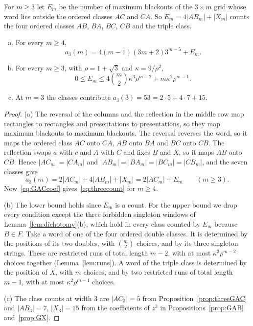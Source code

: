 \begin{theorem}\label{thm:threecount}
For $m\ge3$ let $E_m$ be the number of maximum blackouts of the $3\times m$ grid whose word
lies outside the ordered classes $AC$ and $CA$. So $E_m=4|AB_m|+|X_m|$ counts the four
ordered classes $AB$, $BA$, $BC$, $CB$ and the triple class.
\begin{enumerate}[(a)]
\item For every $m\ge4$,
\begin{equation}\label{eq:threecount}
a_3(m)=4(m-1)(3m+2)3^{m-5}+E_m.
\end{equation}
\item For every $m\ge3$, with $\rho=1+\sqrt3$ and $\kappa=9/\rho^2$,
\begin{equation}\label{eq:Embound}
0\le E_m\le4\binom m2\kappa^3\rho^{m-2}+m\kappa^2\rho^{m-1}.
\end{equation}
\item At $m=3$ the classes contribute $a_3(3)=53=2\cdot5+4\cdot7+15$.
\end{enumerate}
\end{theorem}

\begin{proof}
(a) The reversal of the columns and the reflection in the middle row map rectangles to
rectangles and presentations to presentations, so they map maximum blackouts to maximum
blackouts. The reversal reverses the word, so it maps the ordered class $AC$ onto $CA$, $AB$
onto $BA$ and $BC$ onto $CB$. The reflection swaps $a$ with $c$ and $A$ with $C$ and fixes
$B$ and $X$, so it maps $AB$ onto $CB$. Hence $|AC_m|=|CA_m|$ and
$|AB_m|=|BA_m|=|BC_m|=|CB_m|$, and the seven classes give
\begin{equation}\label{eq:classsum}
a_3(m)=2|AC_m|+4|AB_m|+|X_m|=2|AC_m|+E_m\qquad(m\ge3).
\end{equation}
Now~\eqref{eq:GACcoef} gives~\eqref{eq:threecount} for $m\ge4$.

(b) The lower bound holds since $E_m$ is a count. For the upper bound we drop every condition
except the three forbidden singleton windows of Lemma~\ref{lem:dichotomy}(b), which hold in
every class counted by $E_m$ because $B\in F$. Take a word of one of the four ordered double
classes. It is determined by the positions of its two doubles, with $\binom m2$ choices, and
by its three singleton strings. These are restricted runs of total length $m-2$, with at most
$\kappa^3\rho^{m-2}$ choices together (Lemma~\ref{lem:runs}). A word of the triple class is
determined by the position of $X$, with $m$ choices, and by two restricted runs of total length
$m-1$, with at most $\kappa^2\rho^{m-1}$ choices.

(c) The class counts at width $3$ are $|AC_3|=5$ from Proposition~\ref{prop:threeGAC} and
$|AB_3|=7$, $|X_3|=15$ from the coefficients of $z^3$ in Propositions~\ref{prop:GAB}
and~\ref{prop:GX}.
\end{proof}

